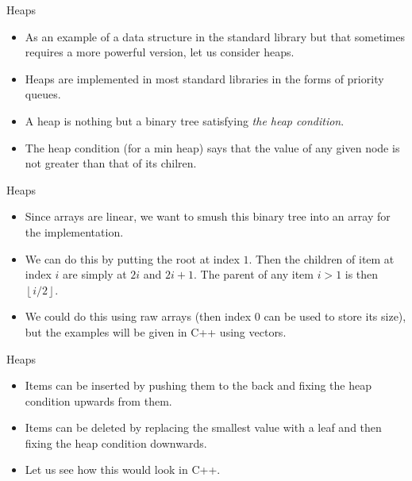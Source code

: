 \documentclass{beamer}
\newcommand\floor[1]{\left\lfloor#1\right\rfloor}
\begin{document}
\begin{frame}[plain]{Heaps}
    \begin{itemize}
        \item As an example of a data structure in the standard library but that sometimes requires a more powerful version, let us consider heaps.
        \item Heaps are implemented in most standard libraries in the forms of priority queues.
        \item A heap is nothing but a binary tree satisfying \textit{the heap condition}.
        \item The heap condition (for a min heap) says that the value of any given node is not greater than that of its chilren.
    \end{itemize}
\end{frame}

\begin{frame}[plain]{Heaps}
    \begin{itemize}
        \item Since arrays are linear, we want to smush this binary tree into an array for the implementation.
        \item We can do this by putting the root at index $1$. Then the children of item at index $i$ are simply at $2i$ and $2i+1$. The parent of any item $i > 1$ is then $\floor{i/2}$.
        \item We could do this using raw arrays (then index $0$ can be used to store its size), but the examples will be given in C++ using vectors.
    \end{itemize}
\end{frame}

\begin{frame}[plain]{Heaps}
    \begin{itemize}
        \item Items can be inserted by pushing them to the back and fixing the heap condition upwards from them.
        \item Items can be deleted by replacing the smallest value with a leaf and then fixing the heap condition downwards.
        \item Let us see how this would look in C++.
    \end{itemize}
\end{frame}
\end{document}
